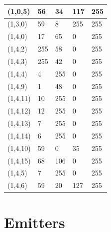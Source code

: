 \documentclass{article}
\begin{document}
\begin{longtable}{|p{2cm}|p{2cm}|p{2cm}|p{2cm}|p{2cm}|}
(1,0,5) & 56 & 34 & 117 & 255 \\ \hline
(1,3,0) & 59 & 8 & 255 & 255 \\ \hline
(1,4,0) & 17 & 65 & 0 & 255 \\ \hline
(1,4,2) & 255 & 58 & 0 & 255 \\ \hline
(1,4,3) & 255 & 42 & 0 & 255 \\ \hline
(1,4,4) & 4 & 255 & 0 & 255 \\ \hline
(1,4,9) & 1 & 48 & 0 & 255 \\ \hline
(1,4,11) & 10 & 255 & 0 & 255 \\ \hline
(1,4,12) & 12 & 255 & 0 & 255 \\ \hline
(1,4,13) & 7 & 255 & 0 & 255 \\ \hline
(1,4,14) & 6 & 255 & 0 & 255 \\ \hline
(1,4,10) & 59 & 0 & 35 & 255 \\ \hline
(1,4,15) & 68 & 106 & 0 & 255 \\ \hline
(1,4,5) & 7 & 255 & 0 & 255 \\ \hline
(1,4,6) & 59 & 20 & 127 & 255 \\ \hline
\end{longtable}

\section*{Emitters}
\end{document}
